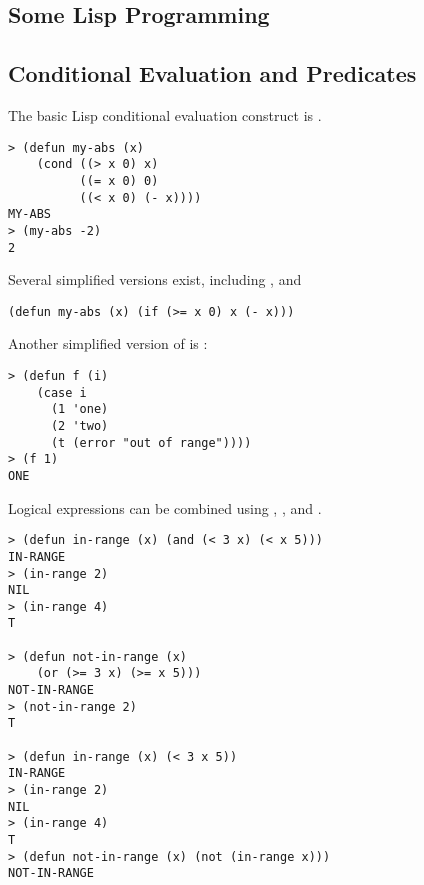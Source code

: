 \begin{slide}{}
\chapter{Some Lisp Programming}
\end{slide}

\begin{slide}{}
\section{Conditional Evaluation and Predicates}
The basic Lisp conditional evaluation construct is .
{\Large
\begin{verbatim}
> (defun my-abs (x)
    (cond ((> x 0) x)
          ((= x 0) 0)
          ((< x 0) (- x))))
MY-ABS
> (my-abs -2)
2
\end{verbatim}}
Several simplified versions exist, including ,  and
{\Large
\begin{verbatim}
(defun my-abs (x) (if (>= x 0) x (- x)))
\end{verbatim}}
Another simplified version of  is :
{\Large
\begin{verbatim}
> (defun f (i)
    (case i
      (1 'one)
      (2 'two)
      (t (error "out of range"))))
> (f 1)
ONE
\end{verbatim}}
\end{slide}

\begin{slide}{}
Logical expressions can be combined using , , and
.
{\Large
\begin{verbatim}
> (defun in-range (x) (and (< 3 x) (< x 5)))
IN-RANGE
> (in-range 2)
NIL
> (in-range 4)
T

> (defun not-in-range (x)
    (or (>= 3 x) (>= x 5)))
NOT-IN-RANGE
> (not-in-range 2)
T

> (defun in-range (x) (< 3 x 5))
IN-RANGE
> (in-range 2)
NIL
> (in-range 4)
T
> (defun not-in-range (x) (not (in-range x)))
NOT-IN-RANGE
\end{verbatim}}
\end{slide}

